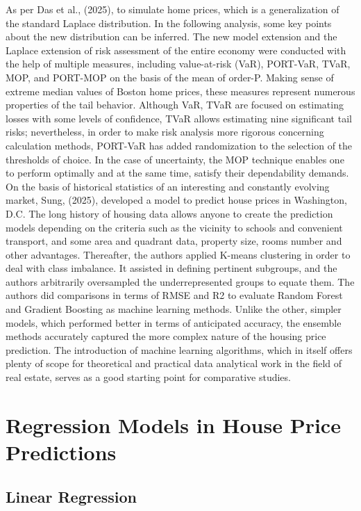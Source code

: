 \documentclass[12pt, a4paper, oneside]{book}
\begin{document}
As per Das et al., (2025), to simulate home prices, which is a generalization of the standard Laplace distribution. In the following analysis, some key points about the new distribution can be inferred. The new model extension and the Laplace extension of risk assessment of the entire economy were conducted with the help of multiple measures, including value-at-risk (VaR), PORT-VaR, TVaR, MOP, and PORT-MOP on the basis of the mean of order-P. Making sense of extreme median values of Boston home prices, these measures represent numerous properties of the tail behavior. Although VaR, TVaR are focused on estimating losses with some levels of confidence, TVaR allows estimating nine significant tail risks; nevertheless, in order to make risk analysis more rigorous concerning calculation methods, PORT-VaR has added randomization to the selection of the thresholds of choice. In the case of uncertainty, the MOP technique enables one to perform optimally and at the same time, satisfy their dependability demands.
On the basis of historical statistics of an interesting and constantly evolving market, Sung, (2025), developed a model to predict house prices in Washington, D.C. The long history of housing data allows anyone to create the prediction models depending on the criteria such as the vicinity to schools and convenient transport, and some area and quadrant data, property size, rooms number and other advantages. Thereafter, the authors applied K-means clustering in order to deal with class imbalance. It assisted in defining pertinent subgroups, and the authors arbitrarily oversampled the underrepresented groups to equate them. The authors did comparisons in terms of RMSE and R2 to evaluate Random Forest and Gradient Boosting as machine learning methods. Unlike the other, simpler models, which performed better in terms of anticipated accuracy, the ensemble methods accurately captured the more complex nature of the housing price prediction. The introduction of machine learning algorithms, which in itself offers plenty of scope for theoretical and practical data analytical work in the field of real estate, serves as a good starting point for comparative studies.



\section{Regression Models in House Price Predictions}

\subsection{Linear Regression}
\end{document}
